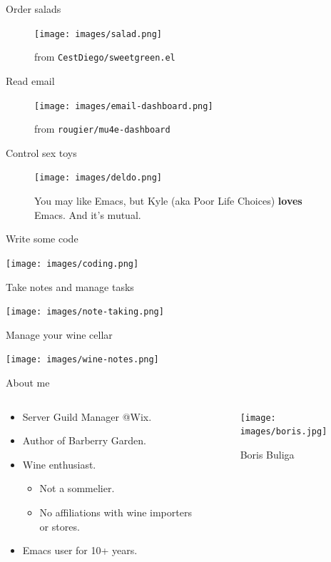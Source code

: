 \documentclass[presentation,aspectratio=169,smaller]{beamer}
\begin{document}
\begin{frame}[label={sec:org9a9e568}]{Order salads}
\begin{figure}[htbp]
\centering
\texttt{[image: images/salad.png]}
\caption{from \texttt{CestDiego/sweetgreen.el}}
\end{figure}
\end{frame}
\begin{frame}[label={sec:org95f9905}]{Read email}
\begin{figure}[htbp]
\centering
\texttt{[image: images/email-dashboard.png]}
\caption{from \texttt{rougier/mu4e-dashboard}}
\end{figure}
\end{frame}
\begin{frame}[label={sec:org5a566c7}]{Control sex toys}
\begin{figure}[htbp]
\centering
\texttt{[image: images/deldo.png]}
\caption{You may like Emacs, but Kyle (aka Poor Life Choices) \textbf{loves} Emacs. And it's mutual.}
\end{figure}
\end{frame}
\begin{frame}[label={sec:orge60ea4b}]{Write some code}
\begin{center}
\texttt{[image: images/coding.png]}
\end{center}
\end{frame}
\begin{frame}[label={sec:org17b0f21}]{Take notes and manage tasks}
\begin{center}
\texttt{[image: images/note-taking.png]}
\end{center}
\end{frame}
\begin{frame}[label={sec:orgc868b6f}]{Manage your wine cellar}
\begin{center}
\texttt{[image: images/wine-notes.png]}
\end{center}
\end{frame}
\begin{frame}[label={sec:orge457b70}]{About me}
\begin{columns}
\begin{column}{0.75\columnwidth}
\begin{itemize}
\item Server Guild Manager @Wix.
\item Author of Barberry Garden.
\item Wine enthusiast.
\begin{itemize}
\item Not a sommelier.
\item No affiliations with wine importers or stores.
\end{itemize}
\item Emacs user for 10+ years.
\end{itemize}
\end{column}
\begin{column}{0.25\columnwidth}
\begin{figure}[htbp]
\centering
\texttt{[image: images/boris.jpg]}
\caption{Boris Buliga}
\end{figure}
\end{column}
\end{columns}
\end{frame}
\end{document}
